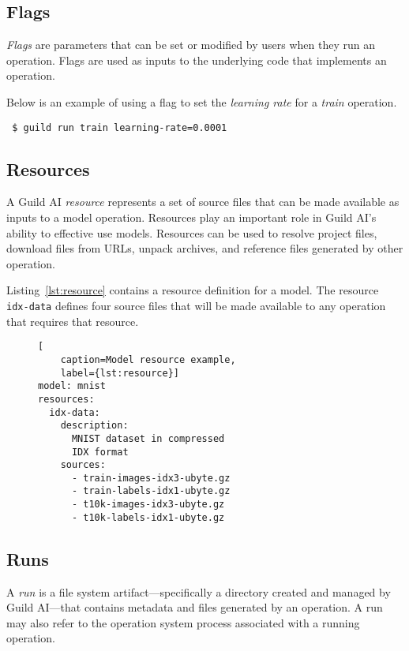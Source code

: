 \documentclass{article}
\begin{document}
\subsection{Flags}

\emph{Flags} are parameters that can be set or modified by users when
they run an operation. Flags are used as inputs to the underlying code
that implements an operation.

Below is an example of using a flag to set the \emph{learning rate}
for a \emph{train} operation.

{\footnotesize
\begin{verbatim}
 $ guild run train learning-rate=0.0001
\end{verbatim}}

\subsection{Resources}
\label{sec:resources}

A Guild AI \emph{resource} represents a set of source files that can
be made available as inputs to a model operation. Resources play an
important role in Guild AI's ability to effective use
models. Resources can be used to resolve project files, download files
from URLs, unpack archives, and reference files generated by other
operation.

Listing~\ref{lst:resource} contains a resource definition for a
model. The resource \verb|idx-data| defines four source files that
will be made available to any operation that requires that resource.

\begin{figure}
\begin{lstlisting}[
    caption=Model resource example,
    label={lst:resource}]
model: mnist
resources:
  idx-data:
    description:
      MNIST dataset in compressed
      IDX format
    sources:
      - train-images-idx3-ubyte.gz
      - train-labels-idx1-ubyte.gz
      - t10k-images-idx3-ubyte.gz
      - t10k-labels-idx1-ubyte.gz
\end{lstlisting}
\end{figure}

\subsection{Runs}

A \emph{run} is a file system artifact---specifically a directory
created and managed by Guild AI---that contains metadata and files
generated by an operation. A run may also refer to the operation
system process associated with a running operation.
\end{document}
